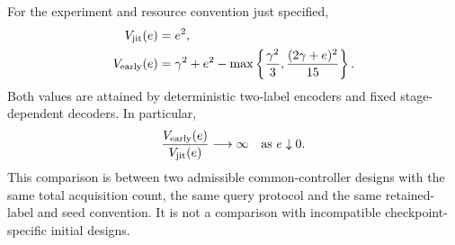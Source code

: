 \begin{theorem}\label{thm:v32-delayed}
For the experiment and resource convention just specified,
\begin{equation}\label{eq:v32-delayed-exact}
 \begin{split}
 V_{\rm jit}(e)&=e^2,\\
 V_{\rm early}(e)&=\gamma^2+e^2-
       \max\left\{\frac{\gamma^2}{3},
                       \frac{(2\gamma+e)^2}{15}\right\}.
 \end{split}
\end{equation}
Both values are attained by deterministic two-label encoders and fixed
stage-dependent decoders. In particular,
\[
 \frac{V_{\rm early}(e)}{V_{\rm jit}(e)}\longrightarrow\infty
                         \quad\hbox{as }e\downarrow0.
\]
This comparison is between two admissible common-controller designs with
the same total acquisition count, the same query protocol and the same
retained-label and seed convention. It is not a comparison with
incompatible checkpoint-specific initial designs.
\end{theorem}

